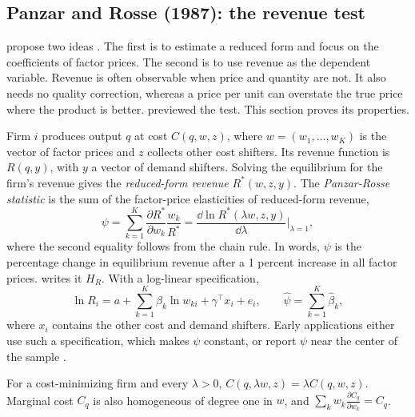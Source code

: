 \subsection{Panzar and Rosse (1987): the revenue test}\label{sec:03-panzar-rosse}

\citet{PanzarRosse1987} propose two ideas \citep[pp.~1034--1035]{Bresnahan1989}. The first is to estimate a
reduced form and focus on the coefficients of factor prices. The second is to use revenue as the dependent
variable. Revenue is often observable when price and quantity are not. It also needs no quality correction,
whereas a price per unit can overstate the true price where the product is better.  previewed
the test. This section proves its properties.

 Firm $i$ produces output $q$ at cost $C(q, w, z)$, where $w = (w_1, \dots, w_K)$ is the
vector of factor prices and $z$ collects other cost shifters. Its revenue function is $R(q, y)$, with $y$ a
vector of demand shifters. Solving the equilibrium for the firm's revenue gives the \emph{reduced-form
revenue} $R^*(w, z, y)$. The \emph{Panzar-Rosse statistic} is the sum of the factor-price elasticities of
reduced-form revenue,
\begin{equation}\label{eq:03-pr-psi}
  \psi = \sum_{k=1}^{K} \frac{\partial R^*}{\partial w_k}\frac{w_k}{R^*}
       = \frac{\dd \ln R^*(\lambda w, z, y)}{\dd \lambda}\bigg|_{\lambda = 1},
\end{equation}
where the second equality follows from the chain rule. In words, $\psi$ is the percentage change in
equilibrium revenue after a 1 percent increase in all factor prices. \citet{Bresnahan1989} writes it $H_R$.
With a log-linear specification,
\begin{equation}\label{eq:03-pr-regression}
  \ln R_i = a + \sum_{k=1}^{K} \beta_k \ln w_{ki} + \gamma^\top x_i + e_i, \qquad \hat\psi = \sum_{k=1}^{K}
  \hat\beta_k ,
\end{equation}
where $x_i$ contains the other cost and demand shifters. Early applications either use such a
specification, which makes $\psi$ constant, or report $\psi$ near the center of the sample
\citep[n.~27]{Bresnahan1989}.

\begin{lemma}\label{lem:03-homogeneity}
For a cost-minimizing firm and every $\lambda > 0$, $C(q, \lambda w, z) = \lambda C(q, w, z)$. Marginal cost
$C_q$ is also homogeneous of degree one in $w$, and $\sum_k w_k \frac{\partial C_q}{\partial w_k} = C_q$.
\end{lemma}

